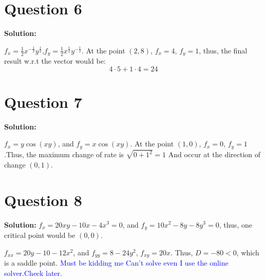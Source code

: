 \documentclass[11pt]{article} %
\begin{document}
\section{Question 6}
\textbf{Solution: }

$f_x=\frac{1}{2}x^{-\frac{1}{2}}y^{\frac{1}{2}}$,$f_y=\frac{1}{2}x^{\frac{1}{2}}y^{-\frac{1}{2}}$. At the point $(2,8)$, $f_x=4$, $f_y=1$, thus, the final result w.r.t the vector would be:
$$4\cdot 5+1\cdot 4=24$$
\section{Question 7}
\textbf{Solution:}

$f_x=y\cos(xy)$, and $f_y=x\cos(xy)$. At the point $(1,0)$, $f_x=0$, $f_y=1$.Thus, the maximum change of rate is $\sqrt{0+1^2}=1$ And occur at the direction of change $(0,1)$.

\section{Question 8}
\textbf{Solution:}
$f_x=20xy-10x-4x^3=0$, and $f_y=10x^2-8y-8y^3=0$, thus, one critical point would be $(0,0)$.

$f_{xx}=20y-10-12x^2$, and $f_{yy}=8-24y^2$, $f_{xy}=20x$. Thus, $D=-80<0$, which is a saddle point.
\textcolor{blue}{Must be kidding me}
\textcolor{blue}{Can't solve even I use the online solver.Check later.}
\end{document}

